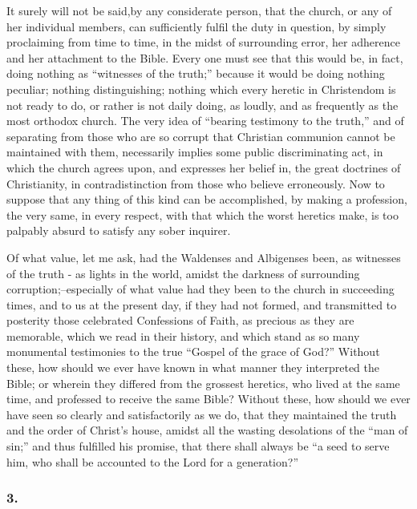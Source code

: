 \documentclass[
]{book}
\begin{document}
It surely will not be said,by any considerate person, that the church, or any of her individual members, can sufficiently fulfil the duty in question, by simply proclaiming from time to time, in the midst of surrounding error, her adherence and her attachment to the Bible. Every one must see that this would be, in fact, doing nothing as ``witnesses of the truth;'' because it would be doing nothing peculiar; nothing distinguishing; nothing which every heretic in Christendom is not ready to do, or rather is not daily doing, as loudly, and as frequently as the most orthodox church. The very idea of ``bearing testimony to the truth,'' and of separating from those who are so corrupt that Christian communion cannot be maintained with them, necessarily implies some public discriminating act, in which the church agrees upon, and expresses her belief in, the great doctrines of Christianity, in contradistinction from those who believe erroneously. Now to suppose that any thing of this kind can be accomplished, by making a profession, the very same, in every respect, with that which the worst heretics make, is too palpably absurd to satisfy any sober inquirer.

Of what value, let me ask, had the Waldenses and Albigenses been, as witnesses of the truth - as lights in the world, amidst the darkness of surrounding corruption;--especially of what value had they been to the church in succeeding times, and to us at the present day, if they had not formed, and transmitted to posterity those celebrated Confessions of Faith, as precious as they are memorable, which we read in their history, and which stand as so many monumental testimonies to the true ``Gospel of the grace of God?'' Without these, how should we ever have known in what manner they interpreted the Bible; or wherein they differed from the grossest heretics, who lived at the same time, and professed to receive the same Bible? Without these, how should we ever have seen so clearly and satisfactorily as we do, that they maintained the truth and the order of Christ's house, amidst all the wasting desolations of the ``man of sin;'' and thus fulfilled his promise, that there shall always be ``a seed to serve him, who shall be accounted to the Lord for a generation?''

\hypertarget{section-2}{%
\subsubsection*{3.}\label{section-2}}
\end{document}
